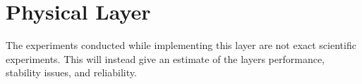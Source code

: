 \section{Physical Layer}
The experiments conducted while implementing this layer are not exact scientific experiments. This will instead give an estimate of the layers performance, stability issues, and reliability.